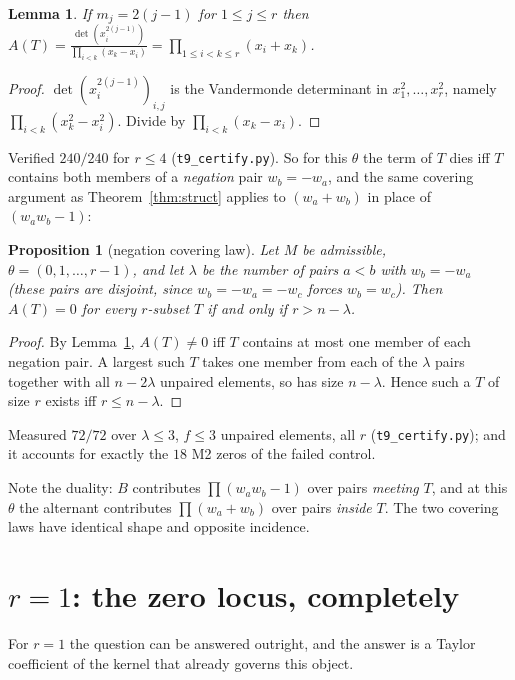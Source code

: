\documentclass[11pt]{article}
\newtheorem{proposition}[theorem]{Proposition}
\newtheorem{lemma}[theorem]{Lemma}
\theoremstyle{definition}
\theoremstyle{remark}
\begin{document}
\begin{lemma}\label{lem:neg}
If $m_j=2(j-1)$ for $1\le j\le r$ then
$\displaystyle A(T)=\frac{\det(x_i^{2(j-1)})}{\prod_{i<k}(x_k-x_i)}
 =\prod_{1\le i<k\le r}(x_i+x_k)$.
\end{lemma}

\begin{proof}
$\det(x_i^{2(j-1)})_{i,j}$ is the Vandermonde determinant in $x_1^2,\dots,x_r^2$,
namely $\prod_{i<k}(x_k^2-x_i^2)$. Divide by $\prod_{i<k}(x_k-x_i)$.
\end{proof}

Verified $240/240$ for $r\le4$ (\texttt{t9\_certify.py}). So for this $\theta$ the
term of $T$ dies iff $T$ contains both members of a \emph{negation} pair
$w_b=-w_a$, and the same covering argument as Theorem~\ref{thm:struct} applies to
$(w_a+w_b)$ in place of $(w_aw_b-1)$:

\begin{proposition}[negation covering law]\label{prop:neg}
Let $M$ be admissible, $\theta=(0,1,\dots,r-1)$, and let $\lambda$ be the number
of pairs $a<b$ with $w_b=-w_a$ (these pairs are disjoint, since $w_b=-w_a=-w_c$
forces $w_b=w_c$). Then $A(T)=0$ for every $r$-subset $T$ if and only if
$r>n-\lambda$.
\end{proposition}

\begin{proof}
By Lemma~\ref{lem:neg}, $A(T)\ne0$ iff $T$ contains at most one member of each
negation pair. A largest such $T$ takes one member from each of the $\lambda$
pairs together with all $n-2\lambda$ unpaired elements, so has size
$n-\lambda$. Hence such a $T$ of size $r$ exists iff $r\le n-\lambda$.
\end{proof}

Measured $72/72$ over $\lambda\le3$, $f\le3$ unpaired elements, all $r$
(\texttt{t9\_certify.py}); and it accounts for exactly the $18$ M2 zeros of the
failed control.

Note the duality: $B$ contributes $\prod(w_aw_b-1)$ over pairs \emph{meeting} $T$,
and at this $\theta$ the alternant contributes $\prod(w_a+w_b)$ over pairs
\emph{inside} $T$. The two covering laws have identical shape and opposite
incidence.

\section{\texorpdfstring{$r=1$}{r=1}: the zero locus, completely}

For $r=1$ the question can be answered outright, and the answer is a Taylor
coefficient of the kernel that already governs this object.
\end{document}
